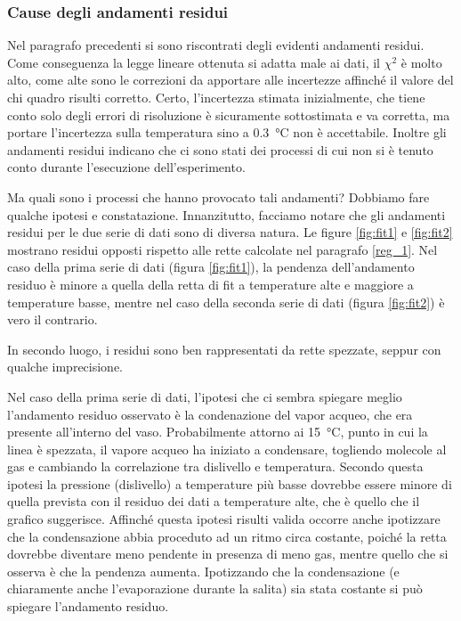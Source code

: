 \subsubsection{Cause degli andamenti residui}

Nel paragrafo precedenti si sono riscontrati degli evidenti andamenti residui. Come conseguenza la legge lineare ottenuta
si adatta male ai dati, il $\chi^2$ è molto alto, come alte sono le correzioni da apportare alle incertezze affinché 
il valore del chi quadro risulti corretto. Certo, l'incertezza stimata inizialmente, che tiene conto solo degli errori di risoluzione
è sicuramente sottostimata e va corretta, ma portare l'incertezza sulla temperatura sino a \SI{0.3}{\celsius} non è accettabile.
Inoltre gli andamenti residui indicano che ci sono stati dei processi di cui non si è tenuto conto durante l'esecuzione dell'esperimento.

Ma quali sono i processi che hanno provocato tali andamenti? Dobbiamo fare qualche ipotesi e constatazione. Innanzitutto,
facciamo notare che gli andamenti residui per le due serie di dati sono di diversa natura. Le figure \ref{fig:fit1} e
\ref{fig:fit2} mostrano residui opposti rispetto alle rette calcolate nel paragrafo \ref{reg_1}. Nel caso della prima
serie di dati (figura \ref{fig:fit1}), la pendenza dell'andamento residuo è minore a quella della retta di fit a
temperature alte e maggiore a temperature basse, mentre nel caso della seconda serie di dati (figura \ref{fig:fit2}) è
vero il contrario.

In secondo luogo, i residui sono ben rappresentati da rette spezzate, seppur con qualche imprecisione.

Nel caso della prima serie di dati, l'ipotesi che ci sembra spiegare meglio l'andamento residuo osservato è la condenazione
del vapor acqueo, che era presente all'interno del vaso. Probabilmente attorno ai \SI{15}{\celsius}, punto in cui la linea
è spezzata, il vapore acqueo ha iniziato a condensare, togliendo molecole al gas e cambiando la correlazione tra dislivello e
temperatura. Secondo questa ipotesi la pressione (dislivello) a temperature più basse dovrebbe essere minore di quella prevista
con il residuo dei dati a temperature alte, che è quello che il grafico suggerisce.
Affinché questa ipotesi risulti valida occorre anche ipotizzare che la condensazione abbia proceduto ad un ritmo circa costante,
poiché la retta dovrebbe diventare meno pendente in presenza di meno gas, mentre quello che si osserva è che la pendenza aumenta.
Ipotizzando che la condensazione (e chiaramente anche l'evaporazione durante la salita) sia stata costante si può spiegare 
l'andamento residuo. 


